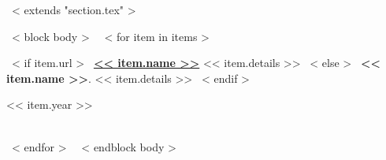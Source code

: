 ~< extends "section.tex" >~


~< block body >~
~< for item in items >~
\begin{minipage}[t]{0.8\textwidth}
  ~< if item.url >~
	\textbf{\href{<< item.url >>}{<< item.name >>}} << item.details >>
  ~< else >~
	\textbf{<< item.name >>}. << item.details >>
  ~< endif >~
\end{minipage}\hfill
\begin{minipage}[t]{0.2\textwidth}
  \hfill << item.year >> 
\end{minipage}\\[2mm]
~< endfor >~
~< endblock body >~
